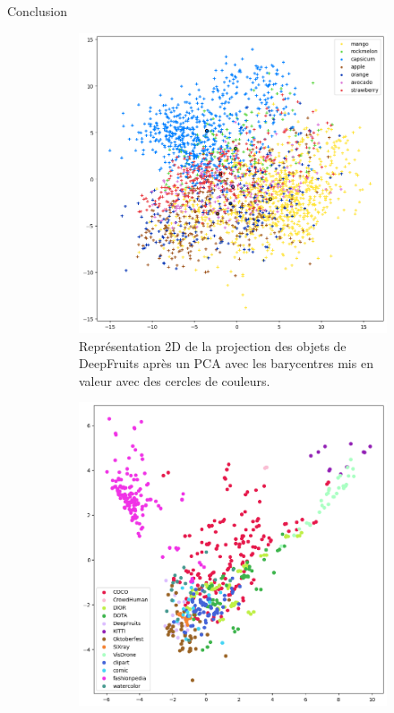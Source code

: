 \begin{subsectionframemod}{Conclusion}
\begin{figure}[!t]
    \centering
    \begin{subfigure}[b]{0.49\textwidth}
         \centering
         \includegraphics[width=\textwidth]{Figures/deepfruits.png}
         \caption{Représentation 2D de la projection des objets de DeepFruits après un PCA avec les barycentres mis en valeur avec des cercles de couleurs.}
         \label{fig:deepfruits}
    \end{subfigure}
    \hfill
    \begin{subfigure}[b]{0.49\textwidth}
         \centering
         \includegraphics[width=\textwidth]{Figures/2d_class_plot.png}

\end{subfigure}
\end{figure}
\end{subsectionframemod}
